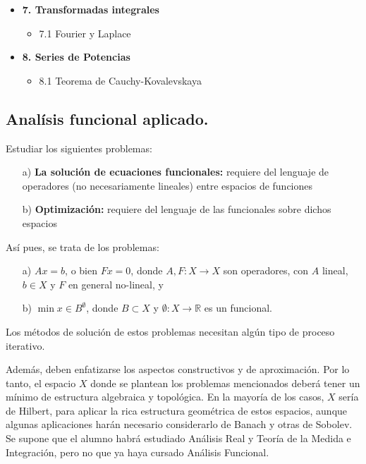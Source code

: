 \documentclass[10pt,a4paper]{article}
\begin{document}
\begin{itemize}
    \item \textbf{7. Transformadas integrales}
    \begin{itemize}
        \item 7.1 Fourier y Laplace
    \end{itemize}

    \item \textbf{8. Series de Potencias}
    \begin{itemize}
        \item 8.1 Teorema de Cauchy-Kovalevskaya
    \end{itemize}
\end{itemize}

\newpage

\subsection{Analísis funcional aplicado.}

Estudiar los siguientes problemas:

\begin{itemize}
    \item[a)]\textbf{ La solución de ecuaciones funcionales:} requiere del lenguaje de operadores (no necesariamente lineales) entre espacios de funciones
    \item[b)]\textbf{ Optimización:} requiere del lenguaje de las funcionales sobre dichos espacios
\end{itemize} 
Así pues, se trata de los problemas:

\begin{itemize}
    \item[a)] \( Ax = b \), o bien \( Fx = 0 \), donde \( A, F: X \to X \) son operadores, con \( A \) lineal, \( b \in X \) y \( F \) en general no-lineal, y
    \item[b)] \( \min x \in B^{\emptyset} \), donde \( B \subset X \) y \( \emptyset :X \to \mathbb{R} \) es un funcional.
\end{itemize}

Los métodos de solución de estos problemas necesitan algún tipo de proceso iterativo.

Además, deben enfatizarse los aspectos constructivos y de aproximación. Por lo tanto, el espacio \( X \) donde se plantean los problemas mencionados deberá tener un mínimo de estructura algebraica y topológica. En la mayoría de los casos, \( X \) sería de Hilbert, para aplicar la rica estructura geométrica de estos espacios, aunque algunas aplicaciones harán necesario considerarlo de Banach y otras de Sobolev. Se supone que el alumno habrá estudiado Análisis Real y Teoría de la Medida e Integración, pero no que ya haya cursado Análisis Funcional.
\end{document}
